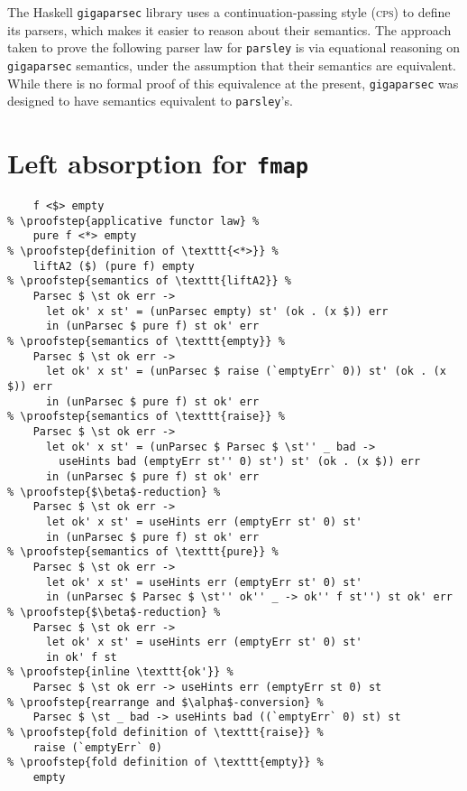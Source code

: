 \documentclass[../../main.tex]{subfiles}
\begin{document}
 \label{appendix:parser-law-proofs}

The Haskell \texttt{gigaparsec} library uses a continuation-passing style (\textsc{cps}) to define its parsers, which makes it easier to reason about their semantics.
The approach taken to prove the following parser law for \texttt{parsley} is via equational reasoning on \texttt{gigaparsec} semantics, under the assumption that their semantics are equivalent.
While there is no formal proof of this equivalence at the present, \texttt{gigaparsec} was designed to have semantics equivalent to \texttt{parsley}'s.

\section{Left absorption for \texttt{fmap}}
\begin{lstlisting}
    f <$> empty
% \proofstep{applicative functor law} %
    pure f <*> empty
% \proofstep{definition of \texttt{<*>}} %
    liftA2 ($) (pure f) empty
% \proofstep{semantics of \texttt{liftA2}} %
    Parsec $ \st ok err ->
      let ok' x st' = (unParsec empty) st' (ok . (x $)) err
      in (unParsec $ pure f) st ok' err
% \proofstep{semantics of \texttt{empty}} %
    Parsec $ \st ok err ->
      let ok' x st' = (unParsec $ raise (`emptyErr` 0)) st' (ok . (x $)) err
      in (unParsec $ pure f) st ok' err
% \proofstep{semantics of \texttt{raise}} %
    Parsec $ \st ok err ->
      let ok' x st' = (unParsec $ Parsec $ \st'' _ bad ->
        useHints bad (emptyErr st'' 0) st') st' (ok . (x $)) err
      in (unParsec $ pure f) st ok' err
% \proofstep{$\beta$-reduction} %
    Parsec $ \st ok err ->
      let ok' x st' = useHints err (emptyErr st' 0) st'
      in (unParsec $ pure f) st ok' err
% \proofstep{semantics of \texttt{pure}} %
    Parsec $ \st ok err ->
      let ok' x st' = useHints err (emptyErr st' 0) st'
      in (unParsec $ Parsec $ \st'' ok'' _ -> ok'' f st'') st ok' err
% \proofstep{$\beta$-reduction} %
    Parsec $ \st ok err ->
      let ok' x st' = useHints err (emptyErr st' 0) st'
      in ok' f st
% \proofstep{inline \texttt{ok'}} %
    Parsec $ \st ok err -> useHints err (emptyErr st 0) st
% \proofstep{rearrange and $\alpha$-conversion} %
    Parsec $ \st _ bad -> useHints bad ((`emptyErr` 0) st) st
% \proofstep{fold definition of \texttt{raise}} %
    raise (`emptyErr` 0)
% \proofstep{fold definition of \texttt{empty}} %
    empty
\end{lstlisting}
\end{document}
